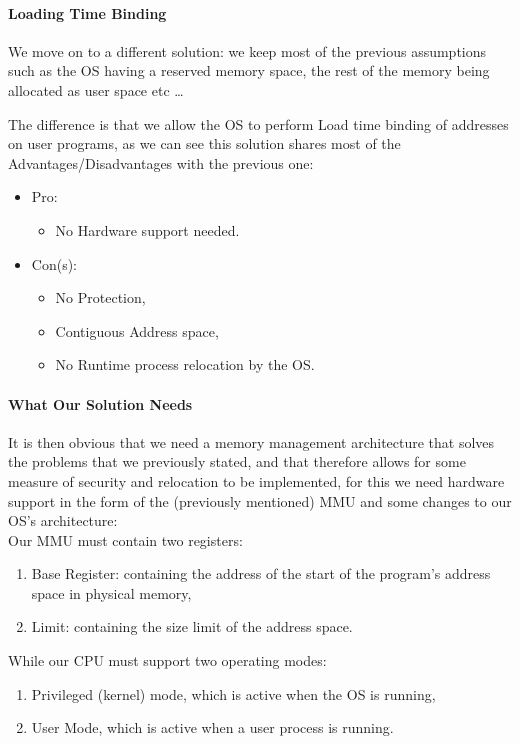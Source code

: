 \documentclass[openright, twoside]{report}
\theoremstyle{definition}
\theoremstyle{example}
\begin{document}
		\paragraph{Loading Time Binding}

		We move on to a different solution: we keep most of the previous assumptions such as the OS having a reserved memory space,
		the rest of the memory being allocated as user space etc \dots

		The difference is that we allow the OS to perform Load time binding of addresses on user programs, as we can see this solution 
		shares most of the Advantages/Disadvantages with the previous one:
		\begin{itemize}
			\item Pro:
			\begin{itemize}
				\item No Hardware support needed.
			\end{itemize}
			\item Con(s):
			\begin{itemize}
				\item No Protection,
				\item Contiguous Address space,
				\item No Runtime process relocation by the OS.
			\end{itemize}
		\end{itemize}

		\paragraph{What Our Solution Needs}
		It is then obvious that we need a memory management architecture that solves the problems that we previously stated, 
		and that therefore allows for some measure of security and relocation to be implemented, for this we need hardware 
		support in the form of the (previously mentioned) MMU and some changes to our OS's architecture: \\

		Our MMU must contain two registers:
		\begin{enumerate}
			\item Base Register: containing the address of the start of the program's address space in physical memory,
			\item Limit: containing the size limit of the address space.
		\end{enumerate}

		While our CPU must support two operating modes:
		\begin{enumerate}
			\item Privileged (kernel) mode, which is active when the OS is running,
			\item User Mode, which is active when a user process is running.
		\end{enumerate}
\end{document}
